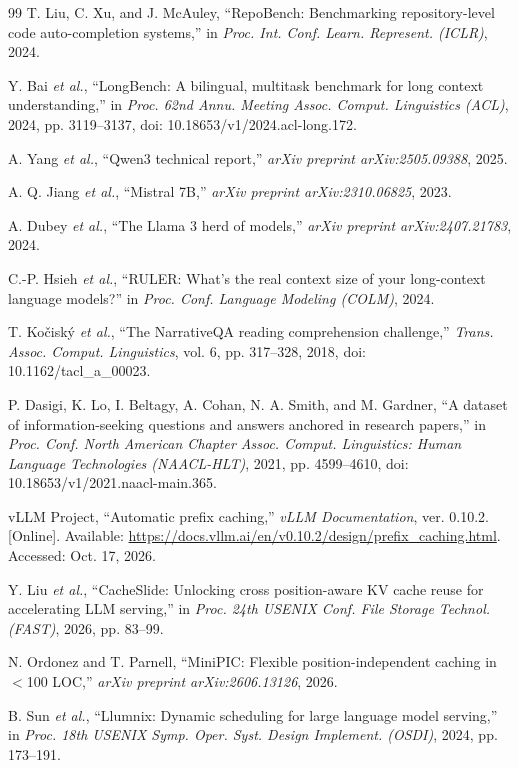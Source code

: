 \begin{thebibliography}{99}
T. Liu, C. Xu, and J. McAuley, ``RepoBench: Benchmarking repository-level code auto-completion systems,'' in \emph{Proc. Int. Conf. Learn. Represent. (ICLR)}, 2024.

Y. Bai \emph{et al.}, ``LongBench: A bilingual, multitask benchmark for long context understanding,'' in \emph{Proc. 62nd Annu. Meeting Assoc. Comput. Linguistics (ACL)}, 2024, pp. 3119--3137, doi: 10.18653/v1/2024.acl-long.172.

A. Yang \emph{et al.}, ``Qwen3 technical report,'' \emph{arXiv preprint arXiv:2505.09388}, 2025.

A. Q. Jiang \emph{et al.}, ``Mistral 7B,'' \emph{arXiv preprint arXiv:2310.06825}, 2023.

A. Dubey \emph{et al.}, ``The Llama 3 herd of models,'' \emph{arXiv preprint arXiv:2407.21783}, 2024.

C.-P. Hsieh \emph{et al.}, ``RULER: What's the real context size of your long-context language models?'' in \emph{Proc. Conf. Language Modeling (COLM)}, 2024.

T. Ko\v{c}isk\'{y} \emph{et al.}, ``The NarrativeQA reading comprehension challenge,'' \emph{Trans. Assoc. Comput. Linguistics}, vol. 6, pp. 317--328, 2018, doi: 10.1162/tacl\_a\_00023.

P. Dasigi, K. Lo, I. Beltagy, A. Cohan, N. A. Smith, and M. Gardner, ``A dataset of information-seeking questions and answers anchored in research papers,'' in \emph{Proc. Conf. North American Chapter Assoc. Comput. Linguistics: Human Language Technologies (NAACL-HLT)}, 2021, pp. 4599--4610, doi: 10.18653/v1/2021.naacl-main.365.

vLLM Project, ``Automatic prefix caching,'' \emph{vLLM Documentation}, ver. 0.10.2. [Online]. Available: \url{https://docs.vllm.ai/en/v0.10.2/design/prefix_caching.html}. Accessed: Oct. 17, 2026.

Y. Liu \emph{et al.}, ``CacheSlide: Unlocking cross position-aware KV cache reuse for accelerating LLM serving,'' in \emph{Proc. 24th USENIX Conf. File Storage Technol. (FAST)}, 2026, pp. 83--99.

N. Ordonez and T. Parnell, ``MiniPIC: Flexible position-independent caching in $<$100 LOC,'' \emph{arXiv preprint arXiv:2606.13126}, 2026.

B. Sun \emph{et al.}, ``Llumnix: Dynamic scheduling for large language model serving,'' in \emph{Proc. 18th USENIX Symp. Oper. Syst. Design Implement. (OSDI)}, 2024, pp. 173--191.


\end{thebibliography}
